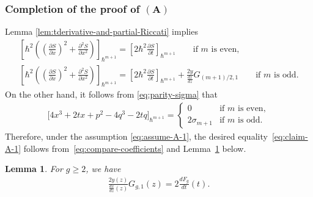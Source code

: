 \documentclass[pdftex]{sigma}
\newtheorem{lem}[thm]{Lemma}
\theoremstyle{definition}
\numberwithin{equation}{section}
\def\p{\partial}
\begin{document}
\subsubsection[Completion of the proof of $(A)$]{Completion of the proof of $\boldsymbol{(A)}$}
\label{subsec:proof-A-2}

Lemma \ref{lem:tderivative-and-partial-Riccati} implies
\begin{gather}
\left[ \hbar^{2}\left( \left(\frac{\p S}{\p x}\right)^{2}
+ \frac{\p^{2} S}{\p x^{2}} \right)  \right]_{\hbar^{m+1}}
= \left[ 2\hbar^{2} \frac{\p S}{\p t} \right]_{\hbar^{m+1}}
 \qquad \text{if $m$ is even},\nonumber\\
\left[ \hbar^{2}\left( \left(\frac{\p S}{\p x}\right)^{2}
+ \frac{\p^{2} S}{\p x^{2}} \right)  \right]_{\hbar^{m+1}}
= \left[ 2\hbar^{2} \frac{\p S}{\p t} \right]_{\hbar^{m+1}}
+ \frac{2y}{\frac{dx}{dz}} G_{(m+1)/2,1}
\qquad \text{if $m$ is odd.}
\label{eq:compare-coefficients}
\end{gather}
On the other hand, it follows from \eqref{eq:parity-sigma} that
\begin{gather*}
\bigl[4x^{3}+2tx + p^{2} -4q^{3} -2 tq \bigr]_{\hbar^{m+1}}
=
\begin{cases}
0 & \text{if $m$ is even}, \\
2\sigma_{m+1} & \text{if $m$ is odd}.
\end{cases}
\end{gather*}
Therefore, under the assumption \eqref{eq:assume-A-1},
the desired equality~\eqref{eq:claim-A-1}
follows from~\eqref{eq:compare-coefficients}
and Lem\-ma~\ref{lem:Gg1} below.

\begin{lem} \label{lem:Gg1}
For $g \ge 2$, we have
\begin{gather} \label{eq:n-is-1-part-in-Ggn}
\frac{2y(z)}{\frac{dx}{dz}(z)} G_{g,1}(z) =
 2 \frac{dF_{g}}{dt}(t).
\end{gather}
\end{lem}
\end{document}
